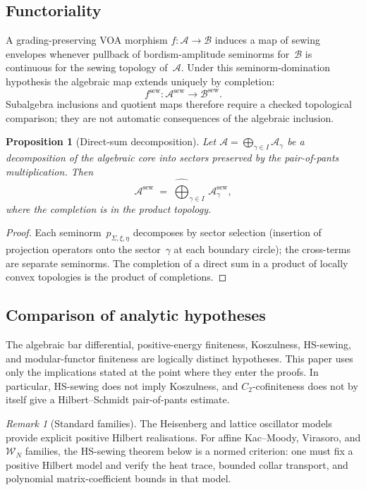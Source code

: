 \documentclass[11pt,reqno]{amsart}
\newtheorem{proposition}[theorem]{Proposition}
\theoremstyle{definition}
\theoremstyle{remark}
\newtheorem{remark}[theorem]{Remark}
\newcommand{\cA}{\mathcal{A}}
\newcommand{\cB}{\mathcal{B}}
\newcommand{\cW}{\mathcal{W}}
\numberwithin{equation}{section}
\begin{document}
\subsection{Functoriality}\label{subsec:sewing-functoriality}

A grading-preserving VOA morphism
$f \colon \cA \to \cB$ induces a map of sewing envelopes whenever
pullback of bordism-amplitude seminorms for~$\cB$ is continuous for
the sewing topology of~$\cA$. Under this seminorm-domination
hypothesis the algebraic map extends uniquely by completion:
\[
f^{\mathrm{sew}} \colon \cA^{\mathrm{sew}} \longrightarrow
\cB^{\mathrm{sew}} .
\]
Subalgebra inclusions and quotient maps therefore require a checked
topological comparison; they are not automatic consequences of the
algebraic inclusion.

\begin{proposition}[Direct-sum decomposition]
\label{prop:sewing-direct-sum}
Let $\cA = \bigoplus_{\gamma \in I} \cA_\gamma$ be a
decomposition of the algebraic core into sectors preserved by
the pair-of-pants multiplication.  Then
\[
\cA^{\mathrm{sew}}
\;=\;
\widehat{\bigoplus}_{\gamma \in I}\,
\cA_\gamma^{\mathrm{sew}},
\]
where the completion is in the product topology.
\end{proposition}

\begin{proof}
Each seminorm~$p_{\Sigma,\xi,\eta}$ decomposes by sector
selection (insertion of projection operators onto the
sector~$\gamma$ at each boundary circle); the cross-terms are
separate seminorms.  The completion of a direct sum in a product
of locally convex topologies is the product of completions.
\end{proof}


\subsection{Comparison of analytic hypotheses}
\label{subsec:five-levels}

The algebraic bar differential, positive-energy finiteness,
Koszulness, HS-sewing, and modular-functor finiteness are logically
distinct hypotheses. This paper uses only the implications stated at
the point where they enter the proofs. In particular, HS-sewing does
not imply Koszulness, and $C_2$-cofiniteness does not by itself give a
Hilbert--Schmidt pair-of-pants estimate.

\begin{remark}[Standard families]\label{rem:standard-landscape-levels}
The Heisenberg and lattice oscillator models provide explicit positive
Hilbert realisations. For affine Kac--Moody, Virasoro, and $\cW_N$
families, the HS-sewing theorem below is a normed criterion: one must
fix a positive Hilbert model and verify the heat trace, bounded collar
transport, and polynomial matrix-coefficient bounds in that model.
\end{remark}
\end{document}
